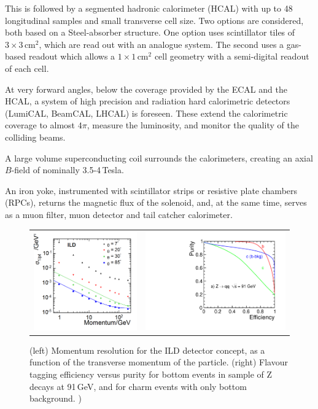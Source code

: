 This is followed by a segmented hadronic calorimeter (HCAL) with up to 48 longitudinal samples and small transverse cell size. Two 
options are considered, both based on a Steel-absorber structure. One option uses scintillator tiles of $3 \times 3$\,cm$^2$, 
which are read out with an analogue system. The second uses a gas-based readout which allows a $1 \times 1$\,cm$^2$ 
cell geometry with a semi-digital readout of each cell. 

At very forward angles, below the coverage provided by the ECAL and the HCAL, a system of high precision and radiation hard calorimetric detectors (LumiCAL, BeamCAL, LHCAL) is foreseen. These
extend the calorimetric coverage to almost $4\pi$, measure the luminosity, and  monitor the quality of the colliding beams.

A large volume superconducting coil surrounds the calorimeters, creating an axial $B$-field of nominally 3.5-4\,Tesla.

An iron  yoke, instrumented with scintillator strips or resistive plate chambers (RPCs), returns the magnetic flux of the solenoid, and, at the same time, serves as a muon filter, muon detector and tail catcher calorimeter.

\begin{figure}[b!]
\begin{tabular}{cc}

\includegraphics[width=0.5\hsize]{Introduction/fig/deltaInvP_all_fits.png} &
\includegraphics[width=0.5\hsize]{Introduction/fig/evalZ-lcfiweights_qq91new_v02-test.pdf}
\end{tabular}
\caption{\label{ild:fig:intro:tracking}(left) Momentum resolution for the ILD detector concept, as a function of the transverse momentum of the particle. (right) Flavour tagging efficiency versus purity for bottom events in sample of Z decays at 91\,GeV, and for charm events with only bottom background. )}
\end{figure}



